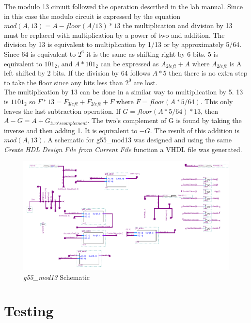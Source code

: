 \documentclass[12pt]{article}
\begin{document}
The modulo 13 circuit followed the operation described in the lab manual. Since in this case the modulo circuit is expressed by the equation $mod(A, 13) = A - floor(A/13)*13$ the multiplication and division by 13 must be replaced with multiplication by a power of two and addition. The division by 13 is equivalent to multiplication by 1/13 or by approximately 5/64. Since 64 is equivalent to $2^6$ it is the same as shifting right by 6 bits. 5 is equivalent to $101_2$, and $A*101_2$ can be expressed as $A_{2left} + A$ where $A_{2left}$ is A left shifted by 2 bits. If the division by 64 follows $A*5$ then there is no extra step to take the floor since any bits less than $2^0$ are lost.\\

The multiplication by 13 can be done in a similar way to multiplication by 5. 13 is $1101_2$ so $F*13 = F_{3left} + F_{2left} + F$ where $ F = floor(A*5/64)$. This only leaves the last subtraction operation. If $G = floor(A*5/64)*13$, then $A - G = A + G_{two's complement}$. The two's complement of G is found by taking the inverse and then adding 1. It is equivalent to $-G$. The result of this addition is $mod(A, 13)$. A schematic for g55\_mod13 was designed and using the same \textit{Create HDL Design File from Current File} function a VHDL file was generated. \\
\begin{figure}[h!t]
\includegraphics[scale=0.45]{graphics/mod13_schematic.png}
\caption{\textit{g55\_mod13} Schematic}
\end{figure}

\section{Testing}
\end{document}
